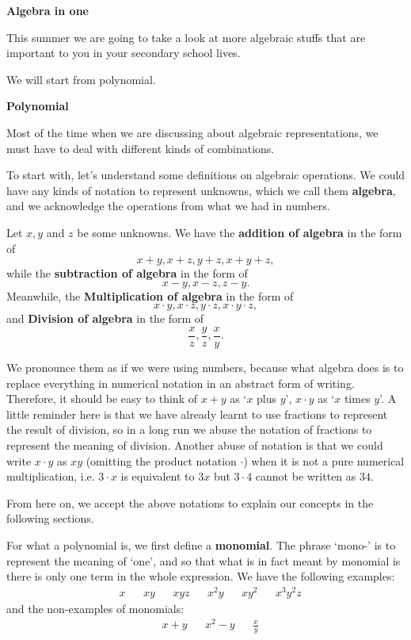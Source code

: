 \documentclass[12pt]{article}
\begin{document}
    
    \pagestyle{fancy}
    \begin{center}
        \textbf{Algebra in one}
    \end{center}

    This summer we are going to take a look at more algebraic stuffs that are important to you in your secondary school lives.

    We will start from polynomial.

    \begin{center}
        \textbf{Polynomial}
    \end{center}

    Most of the time when we are discussing about algebraic representations, we must have to deal with different kinds of combinations.

    To start with, let's understand some definitions on algebraic operations. We could have any kinds of notation to represent unknowns, which we call them \textbf{algebra}, and we acknowledge the operations from what we had in numbers.

    Let $x,y$ and $z$ be some unknowns. We have the \textbf{addition of algebra} in the form of $$x+y,x+z,y+z,x+y+z,$$ while the \textbf{subtraction of algebra} in the form of $$x-y,x-z,z-y.$$ Meanwhile, the \textbf{Multiplication of algebra} in the form of $$x\cdot y,x\cdot z,y\cdot z,x\cdot y\cdot z,$$ and \textbf{Division of algebra} in the form of $$\frac{x}{z},\frac{y}{z},\frac{x}{y}.$$

    We pronounce them as if we were using numbers, because what algebra does is to replace everything in numerical notation in an abstract form of writing. Therefore, it should be easy to think of $x+y$ as `$x$ plus $y$', $x\cdot y$ as `$x$ times $y$'. A little reminder here is that we have already learnt to use fractions to represent the result of division, so in a long run we abuse the notation of fractions to represent the meaning of division. Another abuse of notation is that we could write $x\cdot y$ as $xy$ (omitting the product notation $\cdot$) when it is not a pure numerical multiplication, i.e. $3\cdot x$ is equivalent to $3x$ but $3\cdot 4$ cannot be written as $34$.

    From here on, we accept the above notations to explain our concepts in the following sections.

    For what a polynomial is, we first define a \textbf{monomial}. The phrase `mono-' is to represent the meaning of `one', and so that what is in fact meant by monomial is there is only one term in the whole expression. We have the following examples: \begin{align*}
        &x&&xy&&xyz&&x^2y&&xy^2&&x^3y^2z
    \end{align*}
    and the non-examples of monomials:\begin{align*}
        &x+y&&x^2-y&&\frac{x}{y}
    \end{align*}
\end{document}
